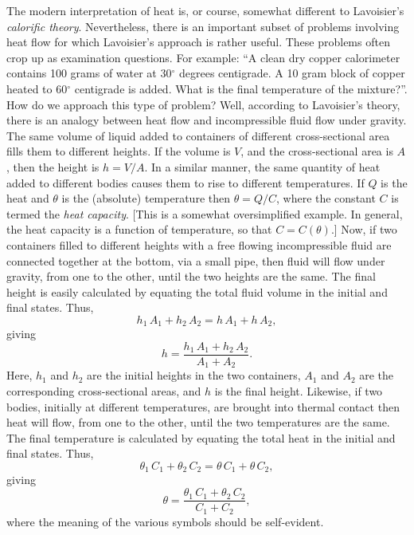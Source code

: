 The modern interpretation of heat is, or course,  somewhat different to Lavoisier's
 {\em calorific theory}. Nevertheless, there is an important subset
of problems involving heat flow for which Lavoisier's approach is
rather useful. 
These problems often crop up as examination questions.
 For example: ``A clean dry copper
calorimeter contains 100 grams of water at 30$^\circ$ degrees centigrade.
A 10 gram block of copper heated to 60$^\circ$ centigrade is added. What is the final
temperature of the mixture?''. 
How do we approach this type of problem? Well, 
according to Lavoisier's theory, there is an 
analogy between heat flow and incompressible 
fluid  flow  under gravity. 
 The same volume of liquid added to 
containers of different cross-sectional area  fills them  to different heights.
If the volume is $V$,  and the cross-sectional area is $A$,  then the height is
$h = V/A$. In a similar manner, the same quantity of heat added to different bodies
causes them to rise to different temperatures. If $Q$ is the heat and
$\theta$ is the (absolute) temperature then 
$\theta = Q/C$, where the constant $C$ is termed the {\em heat capacity}.
[This is a somewhat oversimplified example. In general, the heat capacity is
a function of temperature, so that $C=C(\theta)$.]
 Now, if two containers filled to different heights 
with a free flowing incompressible fluid
are connected together at the bottom, via a small pipe, 
then  fluid will  flow under gravity,
from one
to the other, until the two heights are the same. The final height is easily 
calculated by equating the total fluid volume in the initial and final
states. Thus,
\begin{equation}
h_1 \,A_1 + h_2 \,A_2 = h \,A_1 + h \,A_2,
\end{equation}
giving
\begin{equation}
h = \frac{h_1 \,A_1 + h_2\, A_2}{A_1 + A_2}.
\end{equation}
Here, $h_1$ and $h_2$ are the initial heights in the two containers, $A_1$ and
$A_2$ are the corresponding cross-sectional areas, and $h$ is the final height.
Likewise, if two bodies, initially at different temperatures, are brought into
thermal contact then heat will flow, from one to the other, until the two
temperatures are the same. The final temperature is calculated by equating the total
heat in the initial and final states. Thus,
\begin{equation}
\theta_1\, C_1 + \theta_2\, C_2 = \theta\, C_1 + \theta\, C_2,
\end{equation}
giving
\begin{equation}
\theta = \frac{\theta_1 \,C_1 + \theta_2\, C_2}{C_1 + C_2},
\end{equation}
where the meaning of the various symbols should be self-evident.

